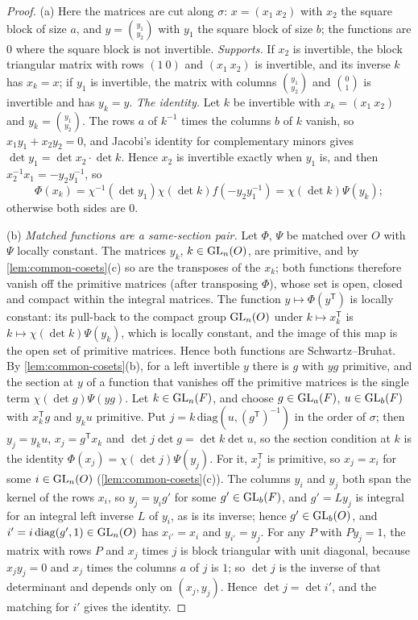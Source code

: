 \begin{proof}
(a) Here the matrices are cut along $\sigma$: $x=(x_1\ x_2)$ with $x_2$ the square block of size $a$, and $y=\binom{y_1}{y_2}$ with $y_1$ the square block of size $b$; the functions are $0$ where the square block
is not invertible. \emph{Supports.} If $x_2$ is invertible, the block triangular matrix with rows $(1\ 0)$ and $(x_1\ x_2)$ is invertible, and its inverse $k$ has $x_k=x$; if $y_1$ is invertible, the matrix
with columns $\binom{y_1}{y_2}$ and $\binom01$ is invertible and has $y_k=y$. \emph{The identity.} Let $k$ be invertible with $x_k=(x_1\ x_2)$ and $y_k=\binom{y_1}{y_2}$. The rows $a$ of $k^{-1}$ times the columns $b$ of
$k$ vanish, so $x_1y_1+x_2y_2=0$, and Jacobi's identity for complementary minors gives $\det y_1=\det x_2\cdot\det k$. Hence $x_2$ is invertible exactly when $y_1$ is, and then $x_2^{-1}x_1=-y_2y_1^{-1}$, so
\[
  \Phi(x_k)=\chi^{-1}(\det y_1)\chi(\det k)f(-y_2y_1^{-1})=\chi(\det k)\Psi(y_k);
\]
otherwise both sides are $0$.

(b) \emph{Matched functions are a same-section pair.} Let $\Phi$, $\Psi$ be matched over $O$ with $\Psi$ locally constant. The matrices $y_k$, $k\in\operatorname{GL}_n(O)$, are primitive, and by \cref{lem:common-cosets}(c)
so are the transposes of the $x_k$; both functions therefore vanish off the primitive matrices (after transposing $\Phi$), whose set is open, closed and compact within the integral matrices. The function
$y\mapsto\Phi(y^{\mathsf T})$ is locally constant: its pull-back to the compact group $\operatorname{GL}_n(O)$ under $k\mapsto x_k^{\mathsf T}$ is $k\mapsto\chi(\det k)\Psi(y_k)$, which is locally constant, and the image of this map
is the open set of primitive matrices. Hence both functions are Schwartz--Bruhat. By \cref{lem:common-cosets}(b), for a left invertible $y$ there is $g$ with $yg$ primitive, and the section at $y$ of a
function that vanishes off the primitive matrices is the single term $\chi(\det g)\Psi(yg)$. Let $k\in\operatorname{GL}_n(F)$, and choose $g\in\operatorname{GL}_a(F)$, $u\in\operatorname{GL}_b(F)$ with $x_k^{\mathsf T}g$ and $y_ku$ primitive. Put
$j=k\,\mathrm{diag}(u,(g^{\mathsf T})^{-1})$ in the order of $\sigma$; then $y_j=y_ku$, $x_j=g^{\mathsf T}x_k$ and $\det j\det g=\det k\det u$, so the section condition at $k$ is the identity
$\Phi(x_j)=\chi(\det j)\Psi(y_j)$. For it, $x_j^{\mathsf T}$ is primitive, so $x_j=x_i$ for some $i\in\operatorname{GL}_n(O)$ (\cref{lem:common-cosets}(c)). The columns $y_i$ and $y_j$ both span the kernel of the rows $x_i$,
so $y_j=y_ig'$ for some $g'\in\operatorname{GL}_b(F)$, and $g'=Ly_j$ is integral for an integral left inverse $L$ of $y_i$, as is its inverse; hence $g'\in\operatorname{GL}_b(O)$, and $i'=i\,\mathrm{diag}(g',1)\in\operatorname{GL}_n(O)$ has $x_{i'}=x_i$ and
$y_{i'}=y_j$. For any $P$ with $Py_j=1$, the matrix with rows $P$ and $x_j$ times $j$ is block triangular with unit diagonal, because $x_jy_j=0$ and $x_j$ times the columns $a$ of $j$ is $1$; so
$\det j$ is the inverse of that determinant and depends only on $(x_j,y_j)$. Hence $\det j=\det i'$, and the matching for $i'$ gives the identity.


\end{proof}
